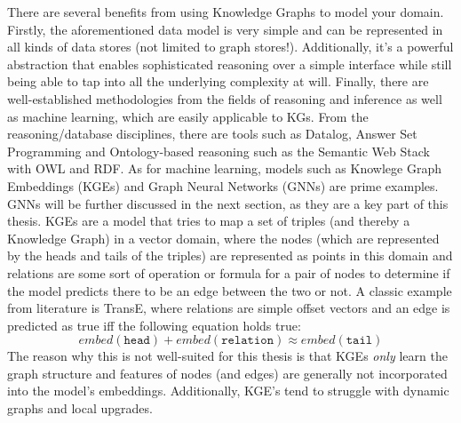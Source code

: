 \documentclass[draft,final]{vutinfth} %
\begin{document}
There are several benefits from using Knowledge Graphs to model your domain. Firstly, the aforementioned data model is very simple and can be represented in all kinds of data stores (not limited to graph stores!). Additionally, it's a powerful abstraction that enables sophisticated reasoning over a simple interface while still being able to tap into all the underlying complexity at will. Finally, there are well-established methodologies from the fields of reasoning and inference as well as machine learning, which are easily applicable to KGs. From the reasoning/database disciplines, there are tools such as Datalog, Answer Set Programming and Ontology-based reasoning such as the Semantic Web Stack with OWL and RDF. As for machine learning, models such as Knowlege Graph Embeddings (KGEs) and Graph Neural Networks (GNNs) are prime examples. GNNs will be further discussed in the next section, as they are a key part of this thesis. KGEs are a model that tries to map a set of triples (and thereby a Knowledge Graph) in a vector domain, where the nodes (which are represented by the heads and tails of the triples) are represented as points in this domain and relations are some sort of operation or formula for a pair of nodes to determine if the model predicts there to be an edge between the two or not. A classic example from literature is TransE, where relations are simple offset vectors and an edge is predicted as true iff the following equation holds true: $$embed(\mathtt{head}) + embed(\mathtt{relation}) \approx embed(\mathtt{tail})$$ 
The reason why this is not well-suited for this thesis is that KGEs \textit{only} learn the graph structure and features of nodes (and edges) are generally not incorporated into the model's embeddings. Additionally, KGE's tend to struggle with dynamic graphs and local upgrades.
\end{document}
